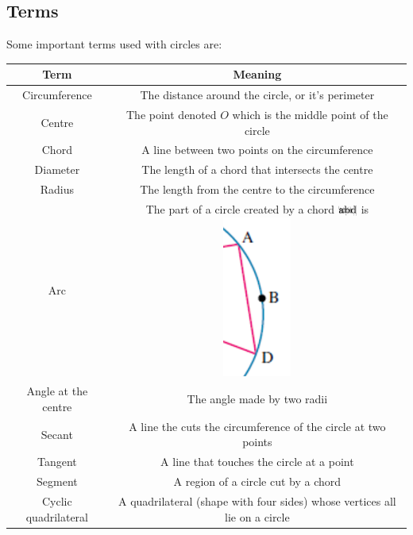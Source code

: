 \documentclass[a4paper,10pt]{report}
\newcommand{\arc}[1]{{\setbox9=\hbox{#1}\ooalign{\resizebox{\wd9}{\height}{\texttoptiebar{\phantom{A}}}\cr#1}}}
\begin{document}
\subsection{Terms}
Some important terms used with circles are:
\begin{center}
	\begin{tabular}{c|c}
		Term                 & Meaning                                                                                 \\ \hline
		Circumference        & The distance around the circle, or it's perimeter                                       \\
		Centre               & The point denoted $O$ which is the middle point of the circle                           \\
		Chord                & A line between two points on the circumference                                          \\
		Diameter             & The length of a chord that intersects the centre                                        \\
		Radius               & The length from the centre to the circumference                                         \\
		Arc                  & The part of a circle created by a chord $\arc{abd}$ is \includegraphics[scale=0.3]{arc} \\
		Angle at the centre  & The angle made by two radii                                                             \\
		Secant               & A line the cuts the circumference of the circle at two points                           \\
		Tangent              & A line that touches the circle at a point                                               \\
		Segment              & A region of a circle cut by a chord                                                     \\
		Cyclic quadrilateral & A quadrilateral (shape with four sides) whose vertices all lie on a circle              \\
	\end{tabular}
\end{center}
\end{document}
